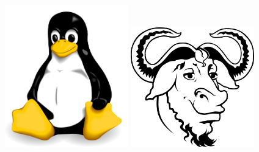 \begin{frame}
    \frametitle{}

    \begin{center}
        \includegraphics[width=0.4\textwidth]{img/linux.png}
        \includegraphics[width=0.4\textwidth]{img/gnu.png}
    \end{center}

\end{frame}

